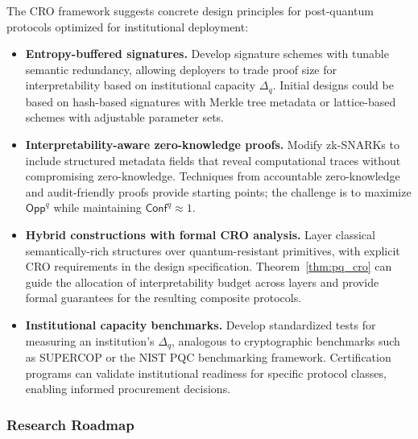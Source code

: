 \documentclass{ieeeaccess}
\newcommand{\Conf}{\mathsf{Conf}}
\newcommand{\Opp}{\mathsf{Opp}}
\begin{document}
The CRO framework suggests concrete design principles for post-quantum protocols 
optimized for institutional deployment:

\begin{itemize}
    \item \textbf{Entropy-buffered signatures.} Develop signature schemes with 
    tunable semantic redundancy, allowing deployers to trade proof size for 
    interpretability based on institutional capacity $\Delta_q$. Initial designs 
    could be based on hash-based signatures with Merkle tree metadata or lattice-based 
    schemes with adjustable parameter sets.
    
    \item \textbf{Interpretability-aware zero-knowledge proofs.} Modify zk-SNARKs 
    to include structured metadata fields that reveal computational traces without 
    compromising zero-knowledge. Techniques from accountable zero-knowledge 
    \cite{Green2022} and audit-friendly proofs \cite{Campanelli2019} provide 
    starting points; the challenge is to maximize $\Opp^q$ while maintaining 
    $\Conf^q \approx 1$.
    
    \item \textbf{Hybrid constructions with formal CRO analysis.} Layer classical 
    semantically-rich structures over quantum-resistant primitives, with explicit 
    CRO requirements in the design specification. Theorem~\ref{thm:pq_cro} can guide 
    the allocation of interpretability budget across layers and provide formal guarantees 
    for the resulting composite protocols.
    
    \item \textbf{Institutional capacity benchmarks.} Develop standardized tests 
    for measuring an institution's $\Delta_q$, analogous to cryptographic benchmarks 
    such as SUPERCOP or the NIST PQC benchmarking framework. Certification programs 
    can validate institutional readiness for specific protocol classes, enabling 
    informed procurement decisions.
\end{itemize}

\subsubsection{Research Roadmap}
\end{document}
